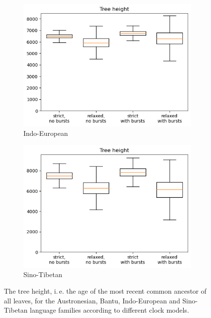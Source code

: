 \documentclass[a4paper]{article}
\begin{document}
\begin{figure}[h]
  \begin{subfigure}{0.4\textwidth}
    \includegraphics[width=\textwidth]{supplement/analysis/indoeuropean_treeheight.png}
    \caption{Indo-European}
    \label{fig:tree_height:indoeuropean}
  \end{subfigure}
  \begin{subfigure}{0.4\textwidth}
    \includegraphics[width=\textwidth]{supplement/analysis/sinotibetan_treeheight.png}
    \caption{Sino-Tibetan}
    \label{fig:tree_height:sinotibetan}
  \end{subfigure}
  
  \caption{The tree height, i.\,e. the age of the most recent common ancestor of all leaves, for the Austronesian, Bantu, Indo-European and Sino-Tibetan language families according to different clock models.}
  \label{fig:tree_height}
\end{figure}
\end{document}
